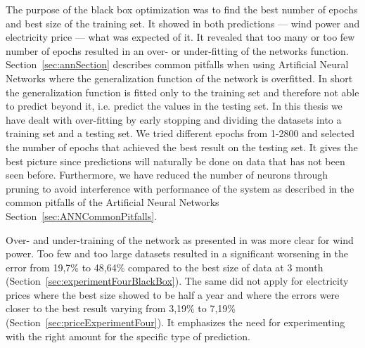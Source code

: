 The purpose of the black box optimization was to find the best number of epochs and best size of the training set. It showed in both predictions --- wind power and electricity price --- what was expected of it. It revealed that too many or too few number of epochs resulted in an over- or under-fitting of the networks function. Section~\ref{sec:annSection} describes common pitfalls when using Artificial Neural Networks where the generalization function of the network is overfitted. In short the generalization function is fitted only to the training set and therefore not able to predict beyond it, i.e. predict the values in the testing set. In this thesis we have dealt with over-fitting by early stopping and dividing the datasets into a training set and a testing set. We tried different epochs from 1-2800 and selected the number of epochs that achieved the best result on the testing set. It gives the best picture since predictions will naturally be done on data that has not been seen before. Furthermore, we have reduced the number of neurons through pruning to avoid interference with performance of the system as described in the common pitfalls of the Artificial Neural Networks Section~\ref{sec:ANNCommonPitfalls}.

Over- and under-training of the network as presented in\cite{1} was more clear for wind power. Too few  and too large datasets resulted in a significant worsening in the error from 19,7\% to 48,64\% compared to the best size of data at 3 month (Section~\ref{sec:experimentFourBlackBox}). The same did not apply for electricity prices where the best size showed to be half a year and where the errors were closer to the best result varying from 3,19\% to 7,19\% (Section~\ref{sec:priceExperimentFour}). It emphasizes the need for experimenting with the right amount for the specific type of prediction.

